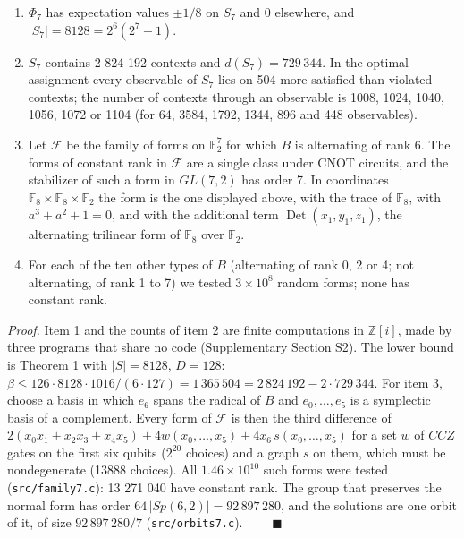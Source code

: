 \documentclass[11pt,a4paper]{article}
\providecommand{\tightlist}{\setlength{\itemsep}{0pt}\setlength{\parskip}{0pt}}
\begin{document}
\begin{enumerate}
\def\labelenumi{\arabic{enumi}.}
\tightlist
\item
  \(\Phi_7\) has expectation values \(\pm 1/8\) on \(S_7\) and \(0\) elsewhere, and \(|S_7| = 8128 = 2^6(2^7-1)\).
\item
  \(S_7\) contains 2 824 192 contexts and \(d(S_7) = 729\,344\). In the optimal assignment every observable
  of \(S_7\) lies on 504 more satisfied than violated contexts; the number of contexts through an
  observable is 1008, 1024, 1040, 1056, 1072 or 1104 (for 64, 3584, 1792, 1344, 896 and 448 observables).
\item
  Let \(\mathcal{F}\) be the family of forms on \(\mathbb{F}_2^7\) for which \(B\) is alternating of rank 6.
  The forms of constant rank in \(\mathcal{F}\) are a single class under CNOT circuits, and the stabilizer
  of such a form in \(GL(7,2)\) has order 7. In coordinates
  \(\mathbb{F}_8 \times \mathbb{F}_8 \times \mathbb{F}_2\) the form is the one displayed above, with the
  trace of \(\mathbb{F}_8\), with \(a^3 + a^2 + 1 = 0\), and with the additional term \(\operatorname{Det}(x_1,y_1,z_1)\),
  the alternating trilinear form of \(\mathbb{F}_8\) over \(\mathbb{F}_2\).
\item
  For each of the ten other types of \(B\) (alternating of rank 0, 2 or 4; not alternating, of rank 1
  to 7) we tested \(3 \times 10^8\) random forms; none has constant rank.
\end{enumerate}

\emph{Proof.} Item 1 and the counts of item 2 are finite computations in \(\mathbb{Z}[i]\), made by three
programs that share no code (Supplementary Section S2). The lower bound is Theorem 1 with \(|S| = 8128\), \(D = 128\):
\(\beta \le 126 \cdot 8128 \cdot 1016/(6\cdot 127) = 1\,365\,504 = 2\,824\,192 - 2 \cdot 729\,344\). For item 3,
choose a basis in which \(e_6\) spans the radical of \(B\) and \(e_0,\dots,e_5\) is a symplectic basis of a
complement. Every form of \(\mathcal{F}\) is then the third difference of
\(2(x_0x_1 + x_2x_3 + x_4x_5) + 4w(x_0,\dots,x_5) + 4x_6\,s(x_0,\dots,x_5)\) for a set \(w\) of \(CCZ\) gates
on the first six qubits (\(2^{20}\) choices) and a graph \(s\) on them, which must be nondegenerate (13888
choices). All \(1.46 \times 10^{10}\) such forms were tested (\texttt{src/family7.c}): 13 271 040 have constant
rank. The group that preserves the normal form has order \(64\,|Sp(6,2)| = 92\,897\,280\), and the
solutions are one orbit of it, of size \(92\,897\,280/7\) (\texttt{src/orbits7.c}). \(\qquad\blacksquare\)
\end{document}

